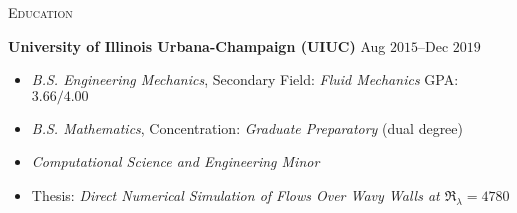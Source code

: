 \documentclass[10pt]{article}
\begin{document}
%

\begin{multicols}{2}
\textsc{Education}
\columnbreak

%
%
%
\textbf{University of Illinois Urbana-Champaign (UIUC)} \hfill Aug $2015$--Dec $2019$

\vspace{-1.75em}
\begin{itemize}[label= ]
    \setlength\itemsep{-0.25em}
    \setlength{\itemindent}{-1.50em}
    \item \textit{B.S. Engineering Mechanics}, Secondary Field: \textit{Fluid Mechanics} \hfill GPA: $3.66/4.00$
    \item \textit{B.S. Mathematics}, Concentration: \textit{Graduate Preparatory} \hfill (dual degree)
    \item \textit{Computational Science and Engineering Minor}
    \item Thesis: \textit{Direct Numerical Simulation of Flows Over Wavy Walls at $\Re_\lambda=4780$}
\end{itemize}
\vspace{-2.0em}

\end{multicols}
\end{document}
